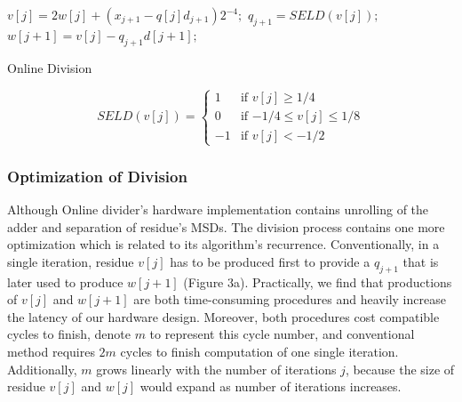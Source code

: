 \documentclass{sig-alternate}
\begin{document}
	          
  
  \begin{algorithm}
		  	\begin{algorithmic}[1]
		  		\newline
		  		
		  		\State $v[j] = 2w[j] + (x_{j+1}-q[j]d_{j+1})2^{-4};$
		  		\State $q_{j+1} = SELD(v[j]);$
		  		\State $w[j+1] = v[j] - q_{j+1}d[j+1];$
		  		\EndFor
		  	\end{algorithmic}
		  	\caption{Online Division}
		  	\label{alg:algorithm2}
  \end{algorithm}	
  \begin{equation}
  SELD (v[j]) = \begin{cases}
  1 &\text{if $v[j] \geq 1/4$}\\
  0 &\text{if $-1/4 \leq v[j] \leq1/8$}\\
  -1 &\text{if $v[j]<-1/2$ }
  \end{cases} 
  \end{equation}
  
  \subsubsection{Optimization of Division}
  	Although Online divider's hardware implementation contains unrolling of the adder and separation of residue's MSDs. The division process contains one more optimization which is related to its algorithm's recurrence. Conventionally, in a single iteration, residue $v[j]$ has to be produced first to provide a $q_{j+1}$ that is later used to produce $w[j+1]$ (Figure 3a). Practically, we find that productions of $v[j]$ and $w[j+1]$ are both time-consuming procedures and heavily increase the latency of our hardware design. Moreover, both procedures cost compatible cycles to finish, denote $m$ to represent this cycle number, and conventional method requires $2m$ cycles to finish computation of one single iteration. Additionally, $m$ grows linearly with the number of iterations $j$, because the size of residue $v[j]$ and $w[j]$ would expand as number of iterations increases.    
   	
\end{document}

